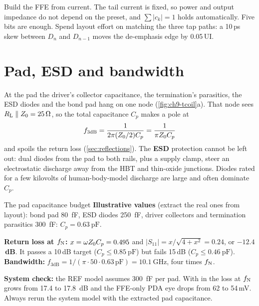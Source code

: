 \begin{insight}
Build the FFE from current. The tail current is fixed, so power and output impedance do not depend on the preset, and $\sum\lvert c_k\rvert=1$ holds automatically. Five bits are enough. Spend layout effort on matching the three tap paths: a 10\,ps skew between $D_n$ and $D_{n-1}$ moves the de-emphasis edge by 0.05\,UI.
\end{insight}

\section{Pad, ESD and bandwidth}\label{sec:esd-pad}

At the pad the driver's collector capacitance, the termination's parasitics, the ESD diodes and the bond pad hang on one node (\cref{fig:ch9-tcoil}a). That node sees $R_\mathrm{L}\parallel Z_0=\qty{25}{\ohm}$, so the total capacitance $C_p$ makes a pole at
\begin{equation}
  f_\mathrm{3dB}=\frac{1}{2\pi(Z_0/2)C_p}=\frac{1}{\pi Z_0 C_p}
  \label{eq:ch9-padpole}
\end{equation}
and spoils the return loss (\cref{sec:reflections}). The \textbf{ESD} protection cannot be left out: dual diodes from the pad to both rails, plus a supply clamp, steer an electrostatic discharge away from the HBT and thin-oxide junctions. Diodes rated for a few kilovolts of human-body-model discharge are large and often dominate $C_p$.

\begin{example}{The \OS{} pad capacitance budget}\label{we:ch9-pad}
\textbf{Illustrative values} (extract the real ones from layout): bond pad \qty{80}{\femto\farad}, ESD diodes \qty{250}{\femto\farad}, driver collectors and termination parasitics \qty{300}{\femto\farad}: $C_p=\qty{0.63}{\pico\farad}$.

\textbf{Return loss at $f_\mathrm{N}$:} $x=\omega Z_0 C_p=0.495$ and $\lvert S_{11}\rvert=x/\sqrt{4+x^2}=0.24$, or \textbf{$-12.4$\,dB}. It passes a 10\,dB target ($C_p\le\qty{0.85}{\pico\farad}$) but fails 15\,dB ($C_p\le\qty{0.46}{\pico\farad}$). \textbf{Bandwidth:} $f_\mathrm{3dB}=1/(\pi\cdot50\cdot0.63\,\mathrm{pF})=\qty{10.1}{\giga\hertz}$, four times $f_\mathrm{N}$.

\textbf{System check:} the REF model assumes \qty{300}{\femto\farad} per pad. With  in  the loss at $f_\mathrm{N}$ grows from 17.4 to \qty{17.8}{\deci\bel} and the FFE-only PDA eye drops from 62 to 54\,mV. Always rerun the system model with the extracted pad capacitance.
\end{example}

